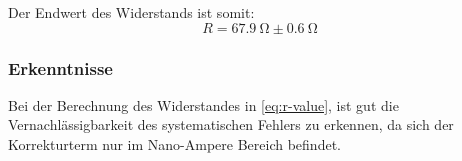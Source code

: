 Der Endwert des Widerstands ist somit: 
\[
    R = \SI{67.9}{\ohm} \pm \SI{0.6}{\ohm}
\]

\subsubsection{Erkenntnisse}

Bei der Berechnung des Widerstandes in \autoref{eq:r-value}, ist gut die Vernachlässigbarkeit des
systematischen Fehlers zu erkennen, da sich der Korrekturterm nur im
Nano-Ampere Bereich befindet.